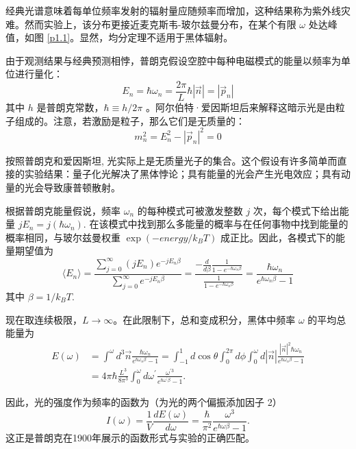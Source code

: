 \documentclass[14pt,a4paper,oneside]{article}
\numberwithin{equation}{section}             %
\numberwithin{figure}{section}               %
\begin{document}
经典光谱意味着每单位频率发射的辐射量应随频率而增加，这种结果称为紫外线灾难。然而实验上，该分布更接近麦克斯韦-玻尔兹曼分布，在某个有限 $\omega$  处达峰值，如图 \ref{p1.1}。显然，均分定理不适用于黑体辐射。

由于观测结果与经典预测相悖，普朗克假设空腔中每种电磁模式的能量以频率为单位进行量化：
\begin{equation}
    E_n=\hbar\omega_n=\frac{2\pi}{L}\hbar|\vec n|=|\vec p_n|
    \label{eq:1.3}
\end{equation}
其中 $h$ 是普朗克常数，$\hbar \equiv h/2π$ 。阿尔伯特·爱因斯坦后来解释这暗示光是由粒子组成的。注意，若激励是粒子，那么它们是无质量的：
\begin{equation}
    m_n^2=E_n^2-|\vec{p}_n|^2=0
    \label{eq:1.4}
\end{equation}

按照普朗克和爱因斯坦, 光实际上是无质量光子的集合。这个假设有许多简单而直接的实验结果：量子化光解决了黑体悖论；具有能量的光会产生光电效应；具有动量的光会导致康普顿散射。

根据普朗克能量假说，频率 $\omega _n$ 的每种模式可被激发整数 $j$ 次，每个模式下给出能量 $jE_n = j(\hbar \omega _n)$. 在该模式中找到那么多能量的概率与在任何事物中找到能量的概率相同，与玻尔兹曼权重 $\exp(-energy/k_BT )$ 成正比。因此，各模式下的能量期望值为
\begin{equation}
    \langle E_n\rangle=\frac{\sum_{j=0}^\infty(jE_n)e^{-jE_n\beta}}{\sum_{j=0}^\infty e^{-jE_n\beta}}=\frac{-\frac{d}{d\beta}\frac{1}{1-e^{-\hbar\omega_n\beta}}}{\frac{1}{1-e^{-\hbar\omega_n\beta}}}=\frac{\hbar\omega_n}{e^{\hbar\omega_n\beta}-1}
    \label{eq:1.5}
\end{equation}
其中 $\beta = 1/k_BT$.

现在取连续极限，$L \rightarrow  \infty$。在此限制下，总和变成积分，黑体中频率 $\omega$ 的平均总能量为
\begin{equation}
    \begin{aligned}E(\omega)&=\int^{\omega}d^{3}\vec{n}\frac{\hbar\omega_{n}}{e^{\hbar\omega_{n}\beta}-1}=\int_{-1}^{1}d\cos\theta\int_{0}^{2\pi}d\phi\int_{0}^{\omega}d|\vec{n}|\frac{|\vec{n}|^{2}\hbar\omega_{n}}{e^{\hbar\omega_{n}\beta}-1}\\&=4\pi\hbar\frac{L^3}{8\pi^3}\int_0^\omega d\omega^{\prime}\frac{\omega^{\prime3}}{e^{\hbar\omega^{\prime}\beta}-1}.\end{aligned}
    \label{eq:1.6}
\end{equation}

因此，光的强度作为频率的函数为（为光的两个偏振添加因子 2）
\begin{equation}
    I(\omega)=\frac1V\frac{dE(\omega)}{d\omega}=\frac\hbar{\pi^2}\frac{\omega^3}{e^{\hbar\omega\beta}-1}.
    \label{eq:1.7}
\end{equation}
这正是普朗克在1900年展示的函数形式与实验的正确匹配。
\end{document}
